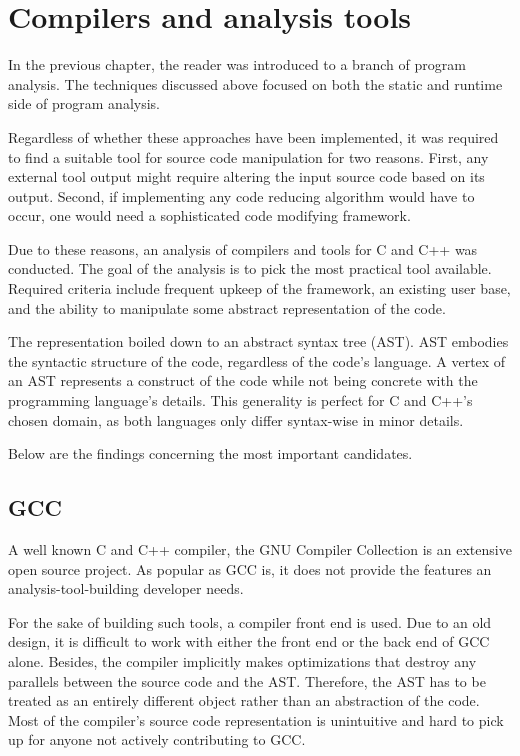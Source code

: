 \chapter{Compilers and analysis tools}

In the previous chapter, the reader was introduced to a branch of program
ana\-ly\-sis. 
The techniques discussed above focused on both the static and runtime
side of program analysis. 

Regardless of whether these approaches have been implemented, it was 
required to find a suitable tool for source code manipulation for two reasons. 
First, any external tool output might require altering the input source code 
based on its output. 
Second, if implementing any code reducing algorithm would have to occur, 
one would need a sophisticated code modifying framework. 

Due to these reasons, an analysis of compilers and tools for C and C++ was conducted. 
The goal of the analysis is to pick the most practical tool available. 
Required criteria include frequent upkeep of the framework, 
an existing user base, and the ability to manipulate some abstract 
representation of the code.

The representation boiled down to an abstract syntax tree (AST). 
AST embodies the syntactic structure of the code, regardless of the code's language. 
A vertex of an AST represents a construct of the code while not being concrete 
with the programming language's details. 
This generality is perfect for C and C++'s chosen domain, 
as both languages only differ syntax-wise in minor details.


Below are the findings concerning the most important candidates.

\section{GCC}

A well known C and C++ compiler, the GNU Compiler Collection is an extensive
open source project. 
As popular as GCC is, it does not provide the features an analysis-tool-building 
developer needs. 

For the sake of building such tools, a compiler front end is used. 
Due to an old design, it is difficult to work with either the front end or 
the back end of GCC alone. 
Besides, the compiler implicitly makes optimizations that destroy any parallels 
between the source code and the AST. 
Therefore, the AST has to be treated as an entirely different object rather than 
an abstraction of the code. 
Most of the compiler's source code representation is unintuitive and 
hard to pick up for anyone not actively contributing to GCC. 

